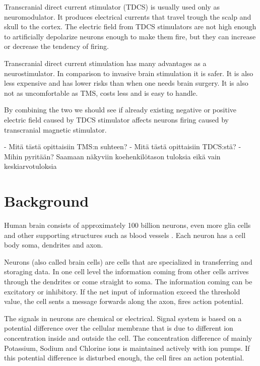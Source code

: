 \documentclass[english,12pt,a4paper,dvips]{article}
\begin{document}
Transcranial direct current stimulator (TDCS) is usually used only as neuromodulator. It produces electrical currents that travel trough the scalp and skull to the cortex. The electric field from TDCS stimulators are not high enough to artificially depolarize neurons enough to make them fire, but they can increase or decrease the tendency of firing. 

Transcranial direct current stimulation has many advantages as a neurostimulator. In comparison to invasive brain stimulation it is safer. It is also less expensive and has lower risks than when one needs brain surgery. It is also not as uncomfortable as TMS, costs less and is easy to handle.

By combining the two we should see if already existing negative or positive electric field caused by TDCS stimulator affects neurons firing caused by transcranial magnetic stimulator. 

- Mitä tästä opittaisiin TMS:n suhteen?
- Mitä tästä opittaisiin TDCS:stä?
- Mihin pyritään? Saamaan näkyviin koehenkilötason tuloksia eikä vain keskiarvotuloksia





\clearpage

 

\section{Background}

Human brain consists of approximately 100 billion neurons, even more glia cells and other supporting structures such as blood vessels \cite{kirja}. Each neuron has a cell body soma, dendrites and axon. 

Neurons (also called brain cells) are cells that are specialized in transferring and storaging data. In one cell level the information coming from other cells arrives through the dendrites or come straight to soma. The information coming can be excitatory or inhibitory. If the net input of information exceed the threshold value, the cell sents a message forwards along the axon, fires action potential.

The signals in neurons are chemical or electrical. Signal system is based on a potential difference over the cellular membrane that is due to different ion concentration inside and outside the cell. The concentration difference of mainly Potassium, Sodium and Chlorine ions is maintained actively with ion pumps. If this potential difference is disturbed enough, the cell fires an action potential. 
\end{document}
